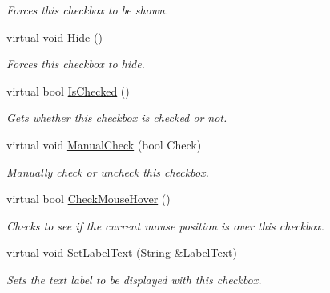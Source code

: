 \begin{DoxyCompactItemize}
\begin{DoxyCompactList}\small\item\em Forces this checkbox to be shown. \item\end{DoxyCompactList}\item 
\hypertarget{classphys_1_1UI_1_1CheckBox_ad58dd6a164e3a3b394899955b612659e}{
virtual void \hyperlink{classphys_1_1UI_1_1CheckBox_ad58dd6a164e3a3b394899955b612659e}{Hide} ()}
\label{classphys_1_1UI_1_1CheckBox_ad58dd6a164e3a3b394899955b612659e}

\begin{DoxyCompactList}\small\item\em Forces this checkbox to hide. \item\end{DoxyCompactList}\item 
virtual bool \hyperlink{classphys_1_1UI_1_1CheckBox_acf01a9b19251212fb626d022d02b53d5}{IsChecked} ()
\begin{DoxyCompactList}\small\item\em Gets whether this checkbox is checked or not. \item\end{DoxyCompactList}\item 
virtual void \hyperlink{classphys_1_1UI_1_1CheckBox_a3720c3f110a3594e45a8115c21deba00}{ManualCheck} (bool Check)
\begin{DoxyCompactList}\small\item\em Manually check or uncheck this checkbox. \item\end{DoxyCompactList}\item 
virtual bool \hyperlink{classphys_1_1UI_1_1CheckBox_a3c9b10c692dfb62dedbd091dac12c115}{CheckMouseHover} ()
\begin{DoxyCompactList}\small\item\em Checks to see if the current mouse position is over this checkbox. \item\end{DoxyCompactList}\item 
virtual void \hyperlink{classphys_1_1UI_1_1CheckBox_aa25bc0f39dca43c00585d107e9a3bcb7}{SetLabelText} (\hyperlink{namespacephys_aa03900411993de7fbfec4789bc1d392e}{String} \&LabelText)
\begin{DoxyCompactList}\small\item\em Sets the text label to be displayed with this checkbox. \item\end{DoxyCompactList}\item 

\end{DoxyCompactItemize}
